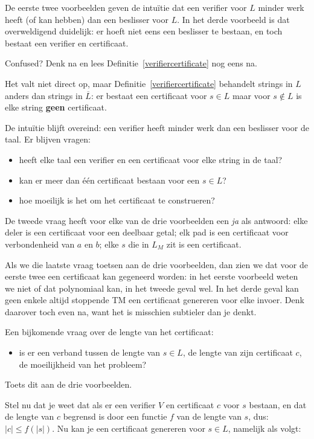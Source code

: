 De eerste twee voorbeelden geven de intu\"itie dat een verifier voor $L$
minder werk heeft (of kan hebben) dan een beslisser voor $L$. In het
derde voorbeeld is dat overweldigend duidelijk: er hoeft niet eens een
beslisser te bestaan, en toch bestaat een verifier en certificaat.

Confused? Denk na en lees Definitie~\ref{verifiercertificate} nog
eens na.

Het valt niet direct op, maar Definitie~\ref{verifiercertificate}
behandelt strings in $L$ anders dan strings in $\overline{L}$: er
bestaat een certificaat voor $s \in L$ maar voor $s \notin L$ is elke
string {\bf geen} certificaat.

De intu\"itie blijft overeind: een verifier heeft minder werk dan een
beslisser voor de taal. Er blijven vragen:
\begin{itemize}
\item 
heeft elke taal een verifier en een certificaat voor elke string in de
taal?
\item
kan er meer dan \'{e}\'{e}n certificaat bestaan voor een $s \in L$?
\item 
hoe moeilijk is het om het certificaat te construeren?
\end{itemize}

De tweede vraag heeft voor elke van de drie voorbeelden een {\em ja}
als antwoord: elke deler is een certificaat voor een deelbaar getal;
elk pad is een certificaat voor verbondenheid van $a$ en $b$; elke $s$
die in $L_M$ zit is een certificaat.

Als we die laatste vraag toetsen aan de drie voorbeelden, dan zien we
dat voor de eerste twee een certificaat kan gegeneerd worden: in het
eerste voorbeeld weten we niet of dat polynomiaal kan, in het tweede
geval wel. In het derde geval kan geen enkele altijd stoppende TM een
certificaat genereren voor elke invoer. Denk daarover toch even na,
want het is misschien subtieler dan je denkt.

Een bijkomende vraag over de lengte van het certificaat:
\begin{itemize}
\item 
is er een verband tussen de lengte van $s \in L$, de lengte van zijn
certificaat $c$, de moeilijkheid van het probleem?
\end{itemize}
Toets dit aan de drie voorbeelden.


Stel nu dat je weet dat als er een verifier $V$ en certificaat $c$
voor $s$ bestaan, en dat de lengte van $c$ begrensd is door een
functie $f$ van de lengte van $s$, dus:
%
$|c| \leq f(|s|)$. Nu kan je een certificaat genereren voor
%
$s \in L$, namelijk als volgt:

